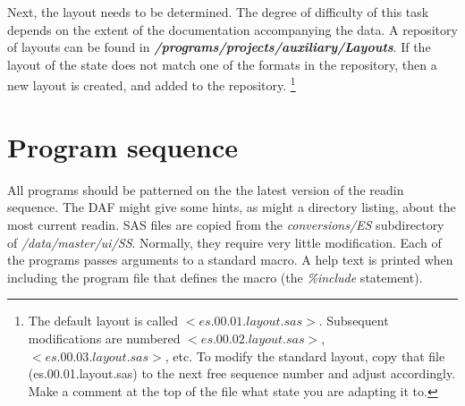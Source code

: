 % 
% 
% 
%

Next, the layout needs to be  determined. The degree of difficulty of this
task  depends on the extent of the documentation
accompanying the data. A repository of layouts can be found in
\textbf{\textit{/programs/projects/auxiliary/Layouts}}.  If the layout of
the state does not match one of the formats in the repository, then a new
layout is created, and added to the repository.%
%
\footnote{The default layout is called $<es.00.01.layout.sas >$. Subsequent
  modifications are numbered $<es.00.02.layout.sas>$,
  $<es.00.03.layout.sas>$, etc. To modify the standard layout,  copy that
  file (es.00.01.layout.sas) to the next free sequence number and adjust accordingly.
 Make a comment at the top of the file what state you are adapting it to.
}


\section{Program sequence}
\label{sec:es202:programs}

All programs should be patterned on the the latest version of the readin
sequence. The DAF might give some hints, as might a directory
listing, about the most current readin. SAS files are copied from the
\textit{conversions/ES} subdirectory of
\textit{/data/master/ui/SS}. Normally, they require very little
modification. Each of the programs passes arguments to a standard macro. A
help text is printed when including the program file that defines the macro
(the \textit{\%include} statement).

